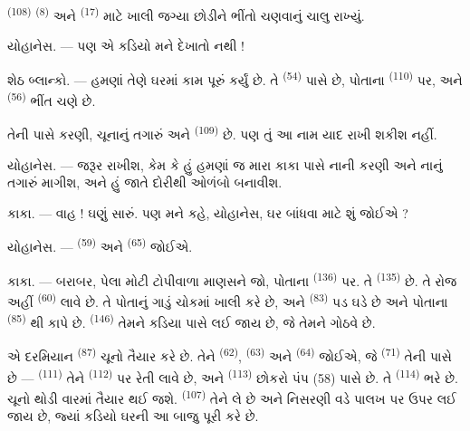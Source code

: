  \textsuperscript{(108)} 
\textsuperscript{(8)} અને  \textsuperscript{(17)} માટે
ખાલી જગ્યા છોડીને ભીંતો ચણવાનું ચાલુ રાખ્યું.

\textsc{યોહાનેસ}. --- પણ એ કડિયો મને દેખાતો નથી !

\textsc{શેઠ બ્લાન્કો}. --- હમણાં તેણે ઘરમાં કામ પૂરું કર્યું છે. તે
 \textsuperscript{(54)} પાસે છે, પોતાના
 \textsuperscript{(110)} પર, અને 
\textsuperscript{(56)} ભીંત ચણે છે.

તેની પાસે કરણી, ચૂનાનું તગારું અને 
\textsuperscript{(109)} છે. પણ તું આ નામ યાદ રાખી શકીશ નહીં.

\textsc{યોહાનેસ}. --- જરૂર રાખીશ, કેમ કે હું હમણાં જ મારા કાકા પાસે
નાની કરણી અને નાનું તગારું માગીશ, અને હું જાતે દોરીથી ઓળંબો બનાવીશ.

\VUsaut{3.0mm}
\VUsaut{3.0mm}

\textsc{કાકા}. --- વાહ ! ઘણું સારું. પણ મને કહે, યોહાનેસ, ઘર બાંધવા
માટે શું જોઈએ ?

\textsc{યોહાનેસ}. ---  \textsuperscript{(59)} અને
 \textsuperscript{(65)} જોઈએ.

\textsc{કાકા}. --- બરાબર, પેલા મોટી ટોપીવાળા માણસને જો, પોતાના
 \textsuperscript{(136)} પર. તે 
\textsuperscript{(135)} છે. તે રોજ અહીં 
\textsuperscript{(60)} લાવે છે. તે પોતાનું ગાડું ચોકમાં ખાલી કરે છે,
અને  \textsuperscript{(83)} પડ ઘડે છે અને પોતાના
 \textsuperscript{(85)} થી કાપે છે.
 \textsuperscript{(146)} તેમને કડિયા પાસે લઈ જાય છે, જે
તેમને ગોઠવે છે.

એ દરમિયાન  \textsuperscript{(87)} ચૂનો તૈયાર કરે
છે. તેને  \textsuperscript{(62)}, 
\textsuperscript{(63)} અને  \textsuperscript{(64)} જોઈએ,
જે  \textsuperscript{(71)} તેની પાસે છે —
 \textsuperscript{(111)} તેને
 \textsuperscript{(112)} પર રેતી લાવે છે, અને
 \textsuperscript{(113)} છોકરો પંપ (58) પાસે છે. તે
 \textsuperscript{(114)} ભરે છે. ચૂનો થોડી વારમાં તૈયાર થઈ
જશે.  \textsuperscript{(107)} તેને લે છે અને
નિસરણી વડે પાલખ પર ઉપર લઈ જાય છે, જ્યાં કડિયો ઘરની આ બાજુ પૂરી કરે
છે.

